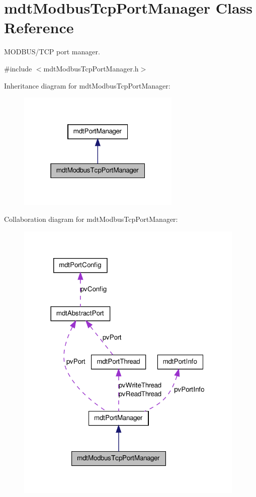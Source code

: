 \hypertarget{classmdt_modbus_tcp_port_manager}{
\section{mdtModbusTcpPortManager Class Reference}
\label{classmdt_modbus_tcp_port_manager}
}


MODBUS/TCP port manager.  




{\ttfamily \#include $<$mdtModbusTcpPortManager.h$>$}



Inheritance diagram for mdtModbusTcpPortManager:\nopagebreak
\begin{figure}[H]
\begin{center}
\leavevmode
\includegraphics[width=220pt]{classmdt_modbus_tcp_port_manager__inherit__graph}
\end{center}
\end{figure}


Collaboration diagram for mdtModbusTcpPortManager:
\nopagebreak
\begin{figure}[H]
\begin{center}
\leavevmode
\includegraphics[width=310pt]{classmdt_modbus_tcp_port_manager__coll__graph}
\end{center}
\end{figure}
